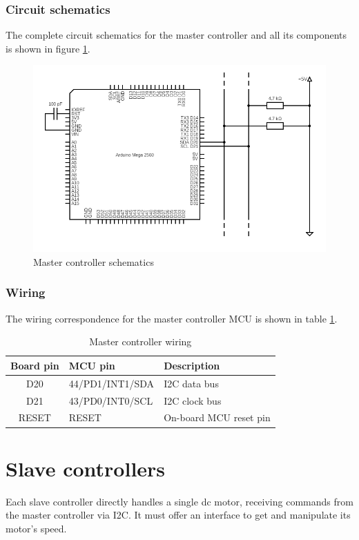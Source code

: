 \documentclass[binding=0.6cm,Lau]{sapthesis}
\makeatletter
\def\maxwidth#1{\ifdim\Gin@nat@width>#1 #1\else\Gin@nat@width\fi}
\makeatother
\begin{document}
\subsection{Circuit schematics}
The complete circuit schematics for the master controller and all its components
is shown in figure \ref{img:master-sch}.
\begin{figure}[hbp]
\begin{centering}
  \includegraphics[width=\maxwidth{\textwidth}]{img/master-schematics}
  \caption{Master controller schematics}
  \label{img:master-sch}
\end{centering}
\end{figure}

\subsection{Wiring}
The wiring correspondence for the master controller MCU is shown in table
\ref{tab:master-wiring}.
\begin{table}[hb]
  \begin{tabularx}{\textwidth}{c l X}
    \toprule
    Board pin & MCU pin & Description \\
    \midrule
    D20 & 44/PD1/INT1/SDA  & I2C data bus \\
    D21 & 43/PD0/INT0/SCL  & I2C clock bus \\
    RESET & RESET & On-board MCU reset pin \\
    \bottomrule
  \end{tabularx}
  \caption{Master controller wiring}
  \label{tab:master-wiring}
\end{table}



\chapter{Slave controllers}
\label{ch:slave}
Each slave controller directly handles a single dc motor, receiving commands
from the master controller via I2C. It must offer an interface to get and
manipulate its motor's speed.
\end{document}
